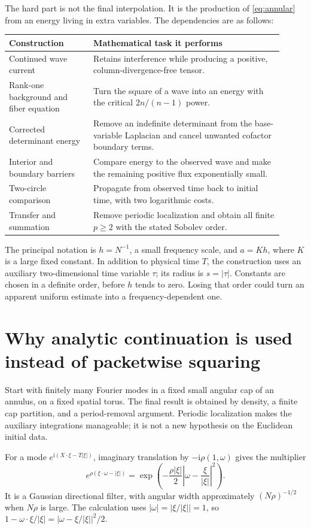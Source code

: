 \documentclass[11pt,a4paper]{article}
\numberwithin{equation}{section}
\theoremstyle{definition}
\theoremstyle{remark}
\begin{document}
The hard part is not the final interpolation. It is the production of
\eqref{eq:annular} from an energy living in extra variables. The dependencies
are as follows:
\begin{center}
\begin{tabular}{p{0.28\linewidth}p{0.63\linewidth}}
\toprule
Construction & Mathematical task it performs\\
\midrule
Continued wave current & Retains interference while producing a positive,
column-divergence-free tensor.\\
Rank-one background and fiber equation & Turn the square of a wave into an
energy with the critical $2n/(n-1)$ power.\\
Corrected determinant energy & Remove an indefinite determinant from the
base-variable Laplacian and cancel unwanted cofactor boundary terms.\\
Interior and boundary barriers & Compare energy to the observed wave and
make the remaining positive flux exponentially small.\\
Two-circle comparison & Propagate from observed time back to initial time,
with two logarithmic costs.\\
Transfer and summation & Remove periodic localization and obtain all finite
$p\ge2$ with the stated Sobolev order.\\
\bottomrule
\end{tabular}
\end{center}
The principal notation is $h=N^{-1}$, a small frequency scale, and $a=Kh$,
where $K$ is a large fixed constant. In addition to physical time $T$, the
construction uses an auxiliary two-dimensional time variable $\tau$; its radius
is $s=|\tau|$. Constants are chosen in a definite order, before $h$ tends to
zero. Losing that order could turn an apparent uniform estimate into a
frequency-dependent one.

\section{Why analytic continuation is used instead of packetwise squaring}
\label{sec:filter}
Start with finitely many Fourier modes in a fixed small angular cap of an
annulus, on a fixed spatial torus. The final result is obtained by density,
a finite cap partition, and a period-removal argument. Periodic localization
makes the auxiliary integrations manageable; it is not a new hypothesis on
the Euclidean initial data.

For a mode $e^{\mathrm i(X\cdot\xi-T|\xi|)}$, imaginary translation by
$-\mathrm i\rho(1,\omega)$ gives the multiplier
\begin{equation}\label{eq:lightfilter}
 e^{\rho(\xi\cdot\omega-|\xi|)}
 =\exp\left(-\frac{\rho|\xi|}{2}
                \left|\omega-\frac\xi{|\xi|}\right|^2\right).
\end{equation}
It is a Gaussian directional filter, with angular width approximately
$(N\rho)^{-1/2}$ when $N\rho$ is large. The calculation uses
$|\omega|=|\xi/|\xi||=1$, so
$1-\omega\cdot\xi/|\xi|=|\omega-\xi/|\xi||^2/2$.
\end{document}
